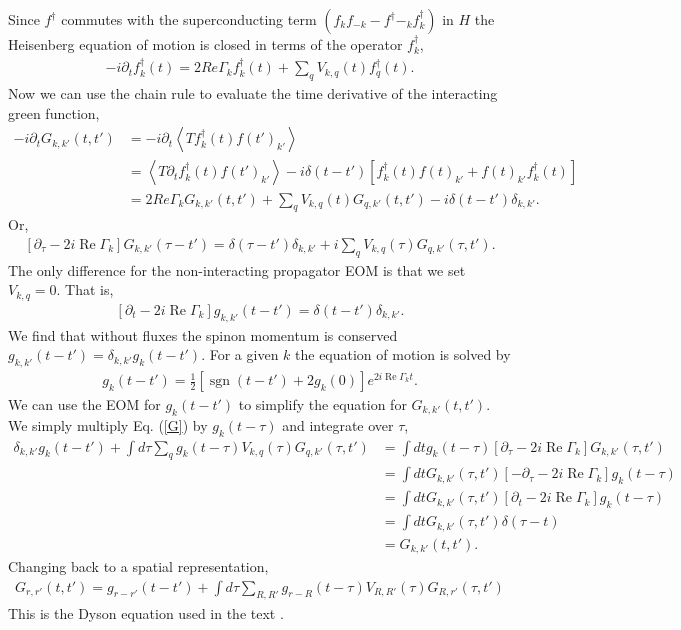\documentclass[aps,pra,preprint,groupedaddress]{revtex4-1}
\DeclareMathOperator{\sgn}{sgn}
\DeclareMathOperator{\re}{Re}
\newcommand{\1}{\mathds{1}}
\begin{document}
Since $f^\dagger$ commutes with the superconducting term $\left(f_k f_{-k} - f^\dagger{-_k} f^\dagger_k \right)$ in $H$ the Heisenberg equation of motion is closed in terms of the operator $f^\dagger_k$,  
\begin{align}
-i \partial_t f^\dagger_k (t) = 2 Re \Gamma_k f^\dagger_k (t) + \sum_{q} V_{k,q}(t) f^\dagger_q(t).
\end{align}
Now we can use the chain rule to evaluate the time derivative of the interacting green function,
\begin{align}
-i \partial_t G_{k,k'}(t,t') &= -i \partial_t\left<T f^\dagger_k (t) f(t')_{k'}\right> \nonumber\\
&=  \left<T \partial_t f^\dagger_k (t) f(t')_{k'}\right> - i \delta(t-t')\left[f^\dagger_k (t) f(t)_{k'} +  f(t)_{k'} f^\dagger_k (t)\right] \nonumber\\
&= 2 Re \Gamma_k G_{k,k'}(t,t') +  \sum_{q} V_{k,q}(t) G_{q,k'}(t,t') - i\delta(t-t')\delta_{k,k'}.
\end{align}  
Or,
\begin{align} \label{G}
\left[\partial_\tau -2i \re \Gamma_k \right]G_{k,k'}(\tau-t') = \delta(\tau-t')\delta_{k,k'} + i \sum_{q} V_{k,q}(\tau) G_{q,k'}(\tau,t').
\end{align} 
The only difference for the non-interacting propagator EOM is that we set $V_{k,q}=0$. That is,
\begin{align}
\left[\partial_t -2i \re \Gamma_k \right]g_{k,k'}(t-t') = \delta(t-t')\delta_{k,k'}.
\end{align} 
We find that without fluxes the spinon momentum is conserved $g_{k,k'}(t-t') = \delta_{k,k'} g_k(t-t')$. For a given $k$ the equation of motion is solved by
\begin{align}
g_k(t-t') = \frac{1}{2}\left[\sgn(t-t') + 2 g_k(0)\right] e^{2i \re \Gamma_k t}.
\end{align}
We can use the EOM for $g_k(t-t')$ to simplify the equation for $G_{k,k'}(t,t')$. We simply multiply Eq. (\ref{G}) by $g_k(t-\tau)$ and integrate over $\tau$,
\begin{align}
\delta_{k,k'}g_k(t-t') + \int d\tau \sum_{q} g_k(t-\tau) V_{k,q}(\tau) G_{q,k'}(\tau,t') &= \int dt g_k(t - \tau) \left[\partial_\tau -2i \re \Gamma_k \right]G_{k,k'}(\tau,t') \nonumber\\
&= \int dt  G_{k,k'}(\tau,t') \left[-\partial_\tau - 2i \re \Gamma_k \right] g_k(t-\tau) \nonumber\\
&= \int dt  G_{k,k'}(\tau,t') \left[\partial_{t} - 2i \re \Gamma_k \right] g_k(t-\tau) \nonumber\\
&= \int dt  G_{k,k'}(\tau,t') \delta(\tau-t) \nonumber\\
&= G_{k,k'}(t,t').
\end{align}
Changing back to a spatial representation,
\begin{align}\label{Dyson3}
G_{r,r'}(t,t') = g_{r-r'}(t-t') + \int d\tau \sum_{R,R'} g_{r-R}(t-\tau) V_{R,R'}(\tau) G_{R,r'}(\tau,t') 
\end{align}
This is the Dyson equation used in the text \cite{Knolle}. 
\end{document}
